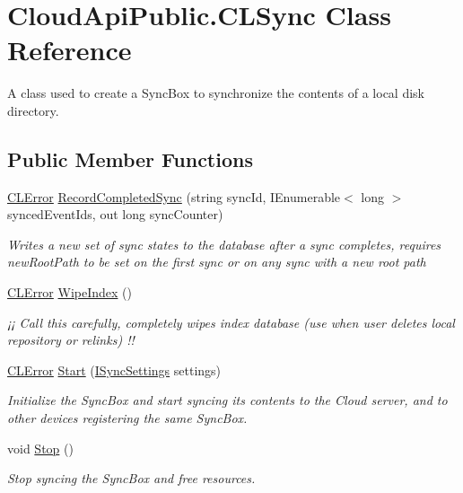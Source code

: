 \hypertarget{class_cloud_api_public_1_1_c_l_sync}{\section{Cloud\-Api\-Public.\-C\-L\-Sync Class Reference}
\label{class_cloud_api_public_1_1_c_l_sync}
}


A class used to create a Sync\-Box to synchronize the contents of a local disk directory.  


\subsection*{Public Member Functions}
\begin{DoxyCompactItemize}
\item 
\hyperlink{class_cloud_api_public_1_1_model_1_1_c_l_error}{C\-L\-Error} \hyperlink{class_cloud_api_public_1_1_c_l_sync_ae42abebf3134701ec50ea49002eb8291}{Record\-Completed\-Sync} (string sync\-Id, I\-Enumerable$<$ long $>$ synced\-Event\-Ids, out long sync\-Counter)
\begin{DoxyCompactList}\small\item\em Writes a new set of sync states to the database after a sync completes, requires new\-Root\-Path to be set on the first sync or on any sync with a new root path \end{DoxyCompactList}\item 
\hyperlink{class_cloud_api_public_1_1_model_1_1_c_l_error}{C\-L\-Error} \hyperlink{class_cloud_api_public_1_1_c_l_sync_a3bbf0e1f002b7cedd12e16562c071dce}{Wipe\-Index} ()
\begin{DoxyCompactList}\small\item\em ¡¡ Call this carefully, completely wipes index database (use when user deletes local repository or relinks) !! \end{DoxyCompactList}\item 
\hyperlink{class_cloud_api_public_1_1_model_1_1_c_l_error}{C\-L\-Error} \hyperlink{class_cloud_api_public_1_1_c_l_sync_ac5c1d1e5f40e739f0074678a8c8399ce}{Start} (\hyperlink{interface_cloud_api_public_1_1_interfaces_1_1_i_sync_settings}{I\-Sync\-Settings} settings)
\begin{DoxyCompactList}\small\item\em Initialize the Sync\-Box and start syncing its contents to the Cloud server, and to other devices registering the same Sync\-Box. \end{DoxyCompactList}\item 
void \hyperlink{class_cloud_api_public_1_1_c_l_sync_aa76639968094d5dec2ec19e10163612f}{Stop} ()
\begin{DoxyCompactList}\small\item\em Stop syncing the Sync\-Box and free resources. \end{DoxyCompactList}\end{DoxyCompactItemize}
